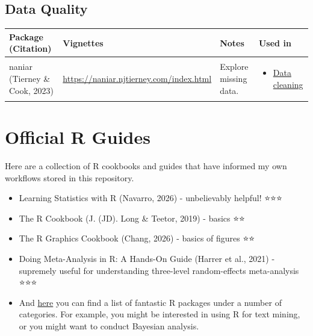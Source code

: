 \documentclass[
  letterpaper,
  DIV=11,
  numbers=noendperiod]{scrreprt}
\providecommand{\tightlist}{%
  \setlength{\itemsep}{0pt}\setlength{\parskip}{0pt}}\usepackage{longtable,booktabs,array}
\begin{document}
\section{Data Quality}\label{data-quality}

\begin{longtable}[]{@{}
  >{\raggedright\arraybackslash}p{}
  >{\raggedright\arraybackslash}p{}
  >{\raggedright\arraybackslash}p{}
  >{\raggedright\arraybackslash}p{}@{}}
\toprule\noalign{}
\begin{minipage}[b]{\linewidth}\raggedright
Package (Citation)
\end{minipage} & \begin{minipage}[b]{\linewidth}\raggedright
Vignettes
\end{minipage} & \begin{minipage}[b]{\linewidth}\raggedright
Notes
\end{minipage} & \begin{minipage}[b]{\linewidth}\raggedright
Used in
\end{minipage} \\
\midrule\noalign{}
\endhead
\bottomrule\noalign{}
\endlastfoot
naniar (Tierney \& Cook, 2023) &
\url{https://naniar.njtierney.com/index.html} & Explore missing data. &
\begin{minipage}[t]{\linewidth}\raggedright
\begin{itemize}
\tightlist
\item
  \href{data-cleaning-overview.qmd}{Data cleaning}
\end{itemize}
\end{minipage} \\
\end{longtable}

\chapter{Official R Guides}\label{official-r-guides}

Here are a collection of R cookbooks and guides that have informed my
own workflows stored in this repository.

\begin{itemize}
\item
  Learning Statistics with R (Navarro, 2026) - unbelievably helpful!
  ⭐⭐⭐
\item
  The R Cookbook (J. (JD). Long \& Teetor, 2019) - basics ⭐⭐
\item
  The R Graphics Cookbook (Chang, 2026) - basics of figures ⭐⭐
\item
  Doing Meta-Analysis in R: A Hands-On Guide (Harrer et al., 2021) -
  supremely useful for understanding three-level random-effects
  meta-analysis ⭐⭐⭐
\item
  And \href{https://github.com/qinwf/awesome-R}{here} you can find a
  list of fantastic R packages under a number of categories. For
  example, you might be interested in using R for text mining, or you
  might want to conduct Bayesian analysis.
\end{itemize}
\end{document}
